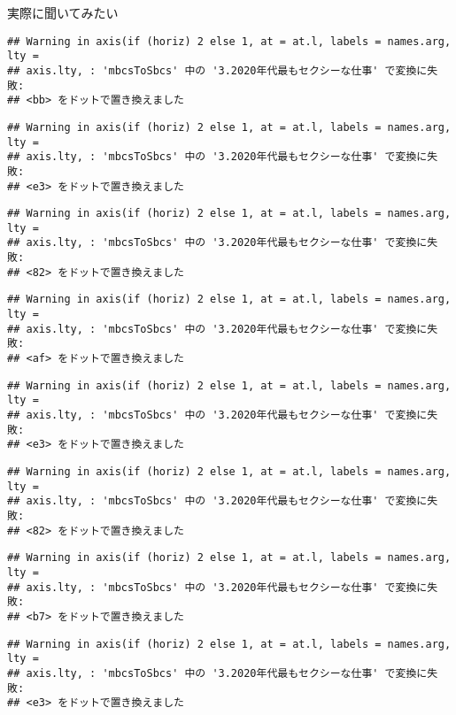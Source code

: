 \documentclass[ignorenonframetext,]{beamer}
\begin{document}
\begin{frame}[fragile]{実際に聞いてみたい}
\begin{verbatim}
## Warning in axis(if (horiz) 2 else 1, at = at.l, labels = names.arg, lty =
## axis.lty, : 'mbcsToSbcs' 中の '3.2020年代最もセクシーな仕事' で変換に失敗:
## <bb> をドットで置き換えました
\end{verbatim}

\begin{verbatim}
## Warning in axis(if (horiz) 2 else 1, at = at.l, labels = names.arg, lty =
## axis.lty, : 'mbcsToSbcs' 中の '3.2020年代最もセクシーな仕事' で変換に失敗:
## <e3> をドットで置き換えました
\end{verbatim}

\begin{verbatim}
## Warning in axis(if (horiz) 2 else 1, at = at.l, labels = names.arg, lty =
## axis.lty, : 'mbcsToSbcs' 中の '3.2020年代最もセクシーな仕事' で変換に失敗:
## <82> をドットで置き換えました
\end{verbatim}

\begin{verbatim}
## Warning in axis(if (horiz) 2 else 1, at = at.l, labels = names.arg, lty =
## axis.lty, : 'mbcsToSbcs' 中の '3.2020年代最もセクシーな仕事' で変換に失敗:
## <af> をドットで置き換えました
\end{verbatim}

\begin{verbatim}
## Warning in axis(if (horiz) 2 else 1, at = at.l, labels = names.arg, lty =
## axis.lty, : 'mbcsToSbcs' 中の '3.2020年代最もセクシーな仕事' で変換に失敗:
## <e3> をドットで置き換えました
\end{verbatim}

\begin{verbatim}
## Warning in axis(if (horiz) 2 else 1, at = at.l, labels = names.arg, lty =
## axis.lty, : 'mbcsToSbcs' 中の '3.2020年代最もセクシーな仕事' で変換に失敗:
## <82> をドットで置き換えました
\end{verbatim}

\begin{verbatim}
## Warning in axis(if (horiz) 2 else 1, at = at.l, labels = names.arg, lty =
## axis.lty, : 'mbcsToSbcs' 中の '3.2020年代最もセクシーな仕事' で変換に失敗:
## <b7> をドットで置き換えました
\end{verbatim}

\begin{verbatim}
## Warning in axis(if (horiz) 2 else 1, at = at.l, labels = names.arg, lty =
## axis.lty, : 'mbcsToSbcs' 中の '3.2020年代最もセクシーな仕事' で変換に失敗:
## <e3> をドットで置き換えました
\end{verbatim}


\end{frame}
\end{document}
